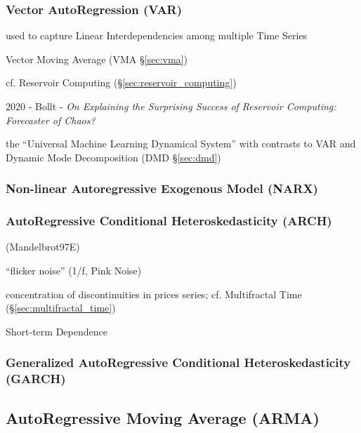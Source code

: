 \subsubsection{Vector AutoRegression (VAR)}\label{sec:var}

used to capture Linear Interdependencies among multiple Time Series

Vector Moving Average (VMA \S\ref{sec:vma})

cf. Reservoir Computing (\S\ref{sec:reservoir_computing})

2020 - Bollt - \emph{On Explaining the Surprising Success of Reservoir
  Computing: Forecaster of Chaos?}

the ``Universal Machine Learning Dynamical System'' with contrasts to VAR and
Dynamic Mode Decomposition (DMD \S\ref{sec:dmd})



\subsubsection{Non-linear Autoregressive Exogenous Model (NARX)}\label{sec:narx}

\subsubsection{AutoRegressive Conditional Heteroskedasticity (ARCH)}
\label{sec:arch}

(Mandelbrot97E)

``flicker noise'' (1/f, Pink Noise)

concentration of discontinuities in prices series; cf. Multifractal Time
(\S\ref{sec:multifractal_time})

Short-term Dependence



\subsubsection{Generalized AutoRegressive Conditional Heteroskedasticity (GARCH)}
\label{sec:garch}



\subsection{AutoRegressive Moving Average (ARMA)}\label{sec:arma}


